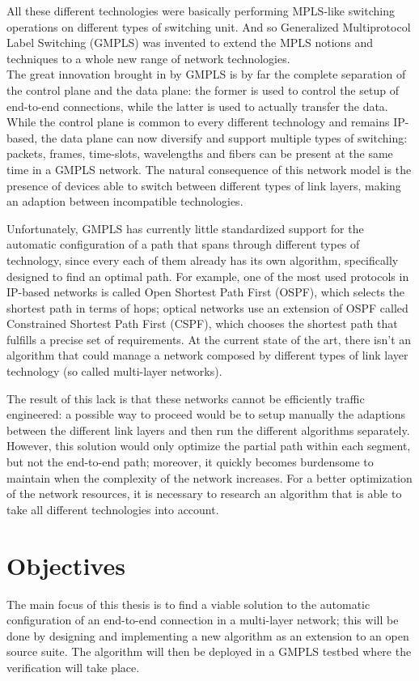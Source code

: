 \documentclass[10pt,a4paper]{report}
\begin{document}
All these different technologies were basically performing MPLS-like
switching operations on different types of switching unit. And so
Generalized Multiprotocol Label Switching (GMPLS) was invented to
extend the MPLS notions and techniques to a whole new range of network
technologies. \\
The great innovation brought in by GMPLS is by far the complete
separation of the control plane and the data plane: the former is used
to control the setup of end-to-end connections, while the latter is
used to actually transfer the data. While the control plane is common
to every different technology and remains IP-based, the data plane can
now diversify and support multiple types of switching: packets,
frames, time-slots, wavelengths and fibers can be present at the same
time in a GMPLS network. The natural consequence of this network model
is the presence of devices able to switch between different types of
link layers, making an adaption between incompatible technologies.

Unfortunately, GMPLS has currently little standardized support for the
automatic configuration of a path that spans through different types
of technology, since every each of them already has its own algorithm,
specifically designed to find an optimal path. For example, one of the
most used protocols in IP-based networks is called Open Shortest Path
First (OSPF), which selects the shortest path in terms of hops;
optical networks use an extension of OSPF called Constrained Shortest
Path First (CSPF), which chooses the shortest path that fulfills a
precise set of requirements. At the current state of the art, there
isn't an algorithm that could manage a network composed by different
types of link layer technology (so called multi-layer networks).

The result of this lack is that these networks cannot be efficiently
traffic engineered: a possible way to proceed would be to setup
manually the adaptions between the different link layers and then run
the different algorithms separately. However, this solution would only
optimize the partial path within each segment, but not the end-to-end
path; moreover, it quickly becomes burdensome to maintain when the
complexity of the network increases. For a better optimization of the
network resources, it is necessary to research an algorithm that is
able to take all different technologies into account.

\newpage

\section{Objectives}
The main focus of this thesis is to find a viable solution to the
automatic configuration of an end-to-end connection in a multi-layer
network; this will be done by designing and implementing a new
algorithm as an extension to an open source suite. The algorithm will
then be deployed in a GMPLS testbed where the verification will take
place.
\end{document}
